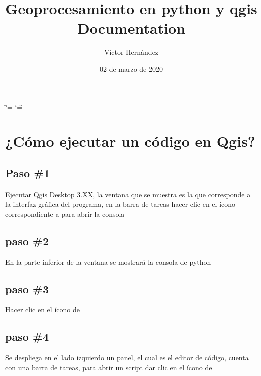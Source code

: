 \documentclass[letterpaper,10pt,spanish]{sphinxmanual}
\title{Geoprocesamiento en python y qgis Documentation}
\date{02 de marzo de 2020}
\author{Víctor Hernández}
\begin{document}
\ifdefined\shorthandoff
  \ifnum\catcode`\=\string=\active\shorthandoff{=}\fi
  \ifnum\catcode`\"=\active{}\fi
\fi

\pagestyle{empty}
\sphinxmaketitle
\pagestyle{plain}
\sphinxtableofcontents
\pagestyle{normal}
\label{\detokenize{index::doc}}



\chapter{¿Cómo ejecutar un código en Qgis?}
\label{\detokenize{ejecucion:como-ejecutar-un-codigo-en-qgis}}\label{\detokenize{ejecucion::doc}}

\section{Paso \#1}
\label{\detokenize{ejecucion:paso-1}}
Ejecutar Qgis Desktop 3.XX, la ventana que se muestra es la que
corresponde a la interfaz gráfica del programa, en la barra de tareas
hacer clic en el ícono correspondiente a  para abrir la consola

\noindent{}


\section{paso \#2}
\label{\detokenize{ejecucion:paso-2}}
En la parte inferior de la ventana se mostrará la consola de python

\noindent{}


\section{paso \#3}
\label{\detokenize{ejecucion:paso-3}}
Hacer clic en el ícono de 

\noindent{}


\section{paso \#4}
\label{\detokenize{ejecucion:paso-4}}
Se despliega en el lado izquierdo un panel, el cual es el editor
de código, cuenta con una barra de tareas, para abrir un script
dar clic en el ícono de 

\noindent{}
\end{document}
